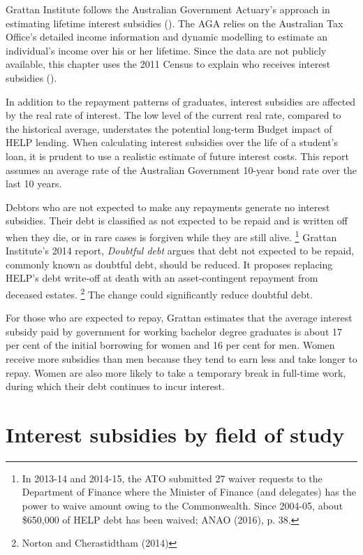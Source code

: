 \documentclass[embargoed]{grattan}
\begin{document}
{Grattan Institute follows the Australian Government Actuary's approach in estimating lifetime interest subsidies ().
The \gls{AGA} relies on the Australian Tax Office's detailed income information and dynamic modelling to estimate an individual's income over his or her lifetime.
Since the data are not publicly available, this chapter uses the 2011 Census to explain who receives interest subsidies ().

In addition to the repayment patterns of graduates, interest subsidies are affected by the real rate of interest.
The low level of the current real rate, compared to the historical average, understates the potential long-term Budget impact of \gls{HELP} lending.
When calculating interest subsidies over the life of a student's loan, it is prudent to use a realistic estimate of future interest costs.
This report assumes an average rate of the Australian Government 10-year bond rate over the last 10 years.


Debtors who are not expected to make any repayments generate no interest subsidies.
Their debt is classified as not expected to be repaid and is written off when they die, or in rare cases is forgiven while they are still alive.%
\footnote{In 2013-14 and 2014-15, the \gls{ATO} submitted 27 waiver requests to the Department of Finance where the Minister of Finance (and delegates) has the power to waive amount owing to the Commonwealth.
Since 2004-05, about \$650,000 of \gls{HELP} debt has been waived; ANAO (2016), p. 38.} Grattan Institute's 2014 report, \emph{Doubtful debt} argues that debt not expected to be repaid, commonly known as doubtful debt, should be reduced.
It proposes replacing \gls{HELP}'s debt write-off at death with an asset-contingent repayment from deceased estates.%
\footnote{Norton and Cherastidtham (2014)} The change could significantly reduce doubtful debt.

For those who are expected to repay, Grattan estimates that the average interest subsidy paid by government for working bachelor degree graduates is about 17 per cent of the initial borrowing for women and 16 per cent for men.
Women receive more subsidies than men because they tend to earn less and take longer to repay.
Women are also more likely to take a temporary break in full-time work, during which their debt continues to incur interest.

\section{Interest subsidies by field of study}\label{interest-subsidies-by-field-of-study}

}
\end{document}
